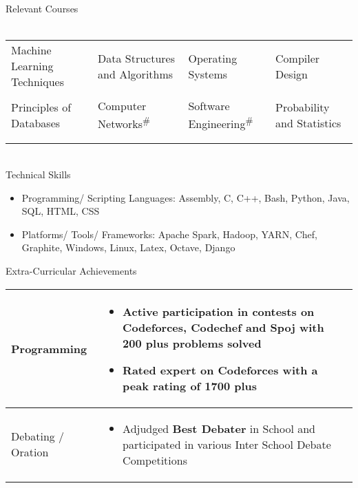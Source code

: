 \documentclass{article}
\begin{document}
{\Large Relevant Courses}\\\\
\begin{tabular}{p{5cm} p{5cm} p{4cm} p{5cm}}
Machine Learning Techniques & Data Structures and Algorithms & Operating Systems & Compiler Design\\\\\vspace{-0.4cm}Principles of Databases &\vspace{-0.4cm} Computer Networks\textsuperscript{\#} &\vspace{-0.4cm}Software Engineering\textsuperscript{\#} & \vspace{-0.4cm}Probability and Statistics\\\\ & & & \vspace{-0.65cm}{\small{\#} : \emph{Ongoing}}
\end{tabular}\\
{\Large Technical Skills}
\renewcommand{\labelitemi}{$\bullet$}
\begin{itemize}[leftmargin=0.82cm]
\item Programming/ Scripting Languages: Assembly, C, C++, Bash, Python, Java, SQL, HTML, CSS
\item Platforms/ Tools/ Frameworks: Apache Spark, Hadoop, YARN,  Chef, Graphite, Windows, Linux, Latex, Octave, Django
\end{itemize}
{\Large Extra-Curricular Achievements}
\newline
\newline
\begin{tabular}{| m{3cm} |  m{15.4cm}|}
\hline
\vspace{0.3cm}Programming & \vspace{-0.4cm}\begin{itemize}[leftmargin=0.3cm]
\setlength\itemsep{0.2pt}\vspace{0.3cm}
\item Active participation in contests on Codeforces, Codechef and Spoj with \textbf{200 plus} problems solved
\item Rated expert on Codeforces with a peak rating of \textbf{1700 plus}
\end{itemize}\\
\hline
\vspace{0.3cm}Debating / Oration & \vspace{-0.4cm}\begin{itemize}[leftmargin=0.3cm]
\setlength\itemsep{0.2pt}\vspace{0.2cm}
\item Adjudged \textbf{Best Debater} in School and participated in various Inter School Debate Competitions
\end{itemize}\\
\hline
\end{tabular}\vspace{0.2cm}
\end{document}
